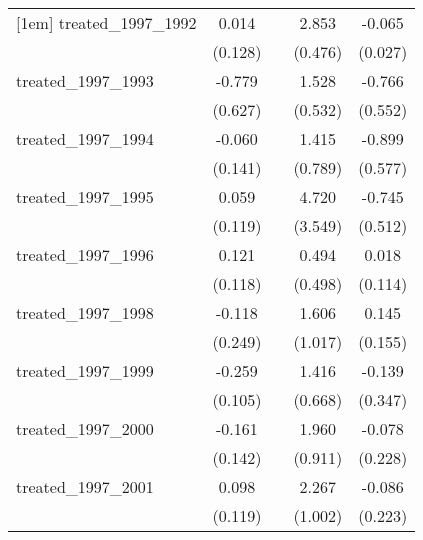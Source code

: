 {\begin{tabular}{l*{4}{c}}
[1em]
treated\_1997\_1992&       0.014         &                     &       2.853\sym{***}&      -0.065\sym{*}  \\
            &     (0.128)         &                     &     (0.476)         &     (0.027)         \\
[1em]
treated\_1997\_1993&      -0.779         &                     &       1.528\sym{**} &      -0.766         \\
            &     (0.627)         &                     &     (0.532)         &     (0.552)         \\
[1em]
treated\_1997\_1994&      -0.060         &                     &       1.415         &      -0.899         \\
            &     (0.141)         &                     &     (0.789)         &     (0.577)         \\
[1em]
treated\_1997\_1995&       0.059         &                     &       4.720         &      -0.745         \\
            &     (0.119)         &                     &     (3.549)         &     (0.512)         \\
[1em]
treated\_1997\_1996&       0.121         &                     &       0.494         &       0.018         \\
            &     (0.118)         &                     &     (0.498)         &     (0.114)         \\
[1em]
treated\_1997\_1998&      -0.118         &                     &       1.606         &       0.145         \\
            &     (0.249)         &                     &     (1.017)         &     (0.155)         \\
[1em]
treated\_1997\_1999&      -0.259\sym{*}  &                     &       1.416\sym{*}  &      -0.139         \\
            &     (0.105)         &                     &     (0.668)         &     (0.347)         \\
[1em]
treated\_1997\_2000&      -0.161         &                     &       1.960\sym{*}  &      -0.078         \\
            &     (0.142)         &                     &     (0.911)         &     (0.228)         \\
[1em]
treated\_1997\_2001&       0.098         &                     &       2.267\sym{*}  &      -0.086         \\
            &     (0.119)         &                     &     (1.002)         &     (0.223)         \\

\end{tabular}}
